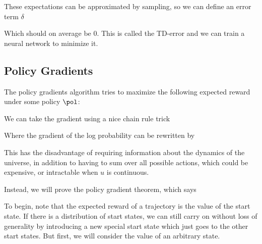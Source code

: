 \documentclass[12pt]{article}
\begin{document}
These expectations can be approximated by sampling, so we can define an error term $\delta$


Which should on average be 0. This is called the TD-error and we can train a neural network to minimize it.

\subsection{Policy Gradients}

The policy gradients algorithm tries to maximize the following expected reward under some policy $\pol$:


We can take the gradient using a nice chain rule trick


Where the gradient of the log probability can be rewritten by

This has the disadvantage of requiring information about the dynamics of the universe, in addition to having to sum over all possible actions, which could be expensive, or intractable when $u$ is continuous.

Instead, we will prove the policy gradient theorem, which says


To begin, note that the expected reward of a trajectory is the value of the start state. If there is a distribution of start states, we can still carry on without loss of generality by introducing a new special start state which just goes to the other start states. But first, we will consider the value of an arbitrary state.
\end{document}
